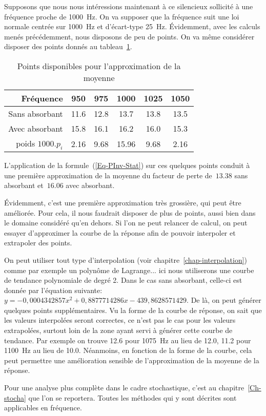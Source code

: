 Supposons que nous nous intéressions maintenant à ce silencieux sollicité à une fréquence proche de 1000~Hz. On va supposer que la fréquence suit une loi normale centrée sur 1000~Hz et d'écart-type 25~Hz. Évidemment, avec les calculs menés précédemment, nous disposons de peu de points. On va même considérer disposer des points donnés au tableau~\ref{Tab-SilenStat}.
\begin{table}[h!]
\centering
\begin{tabular}{r|ccccc}
Fréquence      & 950  & 975  & 1000 & 1025 & 1050 \\
\hline
Sans absorbant & 11.6 & 12.8 & 13.7 & 13.8 & 13.5 \\
Avec absorbant & 15.8 & 16.1 & 16.2 & 16.0 & 15.3\\
poids $1000.p_i$& 2.16 & 9.68 & 15.96 & 9.68 & 2.16
\end{tabular}
\caption{Points disponibles pour l'approximation de la moyenne}\label{Tab-SilenStat}
\end{table}
L'application de la formule~(\ref{Eq-PInv-Stat}) sur ces quelques points conduit à une première approximation de la moyenne du facteur de perte de~$13.38$ sans absorbant et~$16.06$ avec absorbant.

Évidemment, c'est une première approximation très grossière, qui peut être améliorée. Pour cela, il nous faudrait disposer de plus de points, aussi bien dans le domaine considéré qu'en dehors. Si l'on ne peut relancer de calcul, on peut essayer d'approximer la courbe de la réponse afin de pouvoir interpoler et extrapoler des points.

On peut utiliser tout type d'interpolation (voir chapitre~\ref{chap-interpolation}) comme par exemple un polynôme de Lagrange... ici nous utiliserons une courbe de tendance polynomiale de degré 2. Dans le cas sans absorbant, celle-ci est donnée par l'équation suivante: $y= -0,0004342857x^2 + 0,8877714286x - 439,8628571429$. De là, on peut générer quelques points supplémentaires. Vu la forme de la courbe de réponse, on sait que les valeurs interpolées seront correctes, ce n'est pas le cas pour les valeurs extrapolées, surtout loin de la zone ayant servi à générer cette courbe de tendance. Par exemple on trouve 12.6 pour 1075~Hz au lieu de 12.0, 11.2 pour 1100~Hz au lieu de 10.0. Néanmoins, en fonction de la forme de la courbe, cela peut permettre une amélioration sensible de l'approximation de la moyenne de la réponse.

Pour une analyse plus complète dans le cadre stochastique, c'est au chapitre~\ref{Ch-stocha} que l'on se reportera. Toutes les méthodes qui y sont décrites sont applicables en fréquence.


